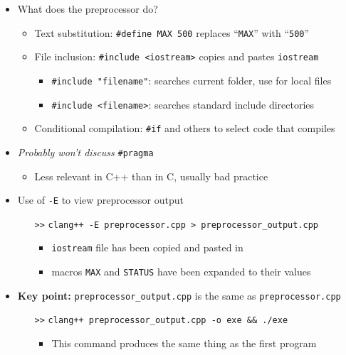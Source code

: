 \documentclass{article}
\begin{document}
\begin{itemize}
	\item What does the preprocessor do? \begin{itemize}
		\item Text substitution: \texttt{\#define MAX 500} replaces ``\texttt{MAX}'' with ``\texttt{500}''
		\item File inclusion: \texttt{\#include <iostream>} copies and pastes \texttt{iostream}
		\begin{itemize}
			\item \texttt{\#include "filename"}: searches current folder, use for local files
			\item \texttt{\#include <filename>}: searches standard include directories
		\end{itemize}
		\item Conditional compilation: \texttt{\#if} and others to select code that compiles
		\end{itemize}
		\vspace{.5em}
		
	\item \textit{Probably won't discuss} \texttt{\#pragma}
	\begin{itemize}
		\item Less relevant in C++ than in C, usually bad practice
	\end{itemize}
	\item Use of \texttt{-E} to view preprocessor output \begin{itemize}
		\item[\texttt{>>}] \texttt{clang++ -E preprocessor.cpp > preprocessor\_output.cpp} \begin{itemize}
			\item \texttt{iostream} file has been copied and pasted in
			\item macros \texttt{MAX} and \texttt{STATUS} have been expanded to their values
		\end{itemize}
	\end{itemize}
	\item \textbf{Key point:} \texttt{preprocessor\_output.cpp} is the same as \texttt{preprocessor.cpp} \begin{itemize}
		\item[\texttt{>>}] \texttt{clang++ preprocessor\_output.cpp -o exe \&\& ./exe}
		\begin{itemize}
			\item This command produces the same thing as the first program
		\end{itemize}
	\end{itemize}
\end{itemize}
\end{document}
